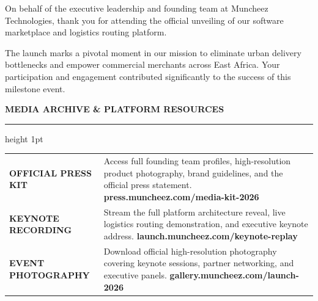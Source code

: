 \documentclass[11pt,a4paper]{article}
\begin{document}
\vspace{0.3cm}
\textsf{\small\color{DeepCharcoal} On behalf of the executive leadership and founding team at Muncheez Technologies, thank you for attending the official unveiling of our software marketplace and logistics routing platform.}

\vspace{0.25cm}
\textsf{\small\color{DeepCharcoal} The launch marks a pivotal moment in our mission to eliminate urban delivery bottlenecks and empower commercial merchants across East Africa. Your participation and engagement contributed significantly to the success of this milestone event.}

\vspace{1.0cm}

{\fontsize{13}{16}\sffamily\bfseries\color{CorporateNavy} MEDIA ARCHIVE \& PLATFORM RESOURCES}

\vspace{0.2cm}
\color{RuleNavy}\hrule height 1pt
\vspace{0.6cm}

\begin{tabularx}{\textwidth}{@{} p{4.5cm} X @{}}
    \textsf{\small\bfseries\color{CorporateNavy} OFFICIAL PRESS KIT} & 
    \textsf{\small\color{DeepCharcoal} Access full founding team profiles, high-resolution product photography, brand guidelines, and the official press statement.} \newline
    \textsf{\small\bfseries\color{LinkBlue} press.muncheez.com/media-kit-2026} \\[0.6cm]
    
    \textsf{\small\bfseries\color{CorporateNavy} KEYNOTE RECORDING} & 
    \textsf{\small\color{DeepCharcoal} Stream the full platform architecture reveal, live logistics routing demonstration, and executive keynote address.} \newline
    \textsf{\small\bfseries\color{LinkBlue} launch.muncheez.com/keynote-replay} \\[0.6cm]
    
    \textsf{\small\bfseries\color{CorporateNavy} EVENT PHOTOGRAPHY} & 
    \textsf{\small\color{DeepCharcoal} Download official high-resolution photography covering keynote sessions, partner networking, and executive panels.} \newline
    \textsf{\small\bfseries\color{LinkBlue} gallery.muncheez.com/launch-2026} \\
\end{tabularx}
\end{document}
